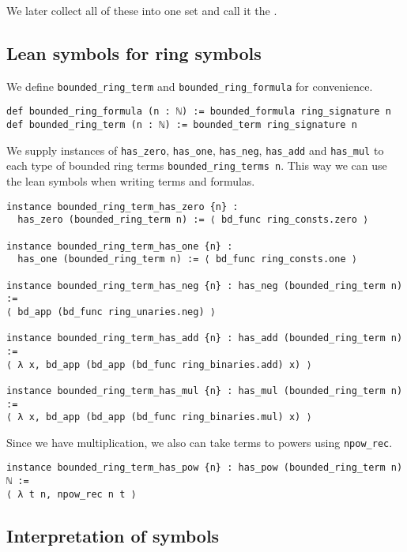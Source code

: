We later collect all of these into one set and call it the
.

\subsection{Lean symbols for ring symbols}

We define \texttt{bounded\_ring\_term} and \texttt{bounded\_ring\_formula}
for convenience.

\begin{lstlisting}
def bounded_ring_formula (n : ℕ) := bounded_formula ring_signature n
def bounded_ring_term (n : ℕ) := bounded_term ring_signature n\end{lstlisting}

We supply instances of \texttt{has\_zero}, \texttt{has\_one}, \texttt{has\_neg},
\texttt{has\_add} and \texttt{has\_mul} to each type of bounded ring terms
\texttt{bounded\_ring\_terms n}.
This way we can use the lean symbols when writing terms and formulas.

\begin{lstlisting}
instance bounded_ring_term_has_zero {n} :
  has_zero (bounded_ring_term n) := ⟨ bd_func ring_consts.zero ⟩

instance bounded_ring_term_has_one {n} :
  has_one (bounded_ring_term n) := ⟨ bd_func ring_consts.one ⟩

instance bounded_ring_term_has_neg {n} : has_neg (bounded_ring_term n) :=
⟨ bd_app (bd_func ring_unaries.neg) ⟩

instance bounded_ring_term_has_add {n} : has_add (bounded_ring_term n) :=
⟨ λ x, bd_app (bd_app (bd_func ring_binaries.add) x) ⟩

instance bounded_ring_term_has_mul {n} : has_mul (bounded_ring_term n) :=
⟨ λ x, bd_app (bd_app (bd_func ring_binaries.mul) x) ⟩\end{lstlisting}

Since we have multiplication, we also can take terms to powers
using \texttt{npow\_rec}.

\begin{lstlisting}
instance bounded_ring_term_has_pow {n} : has_pow (bounded_ring_term n) ℕ :=
⟨ λ t n, npow_rec n t ⟩
\end{lstlisting}

\subsection{Interpretation of symbols}

